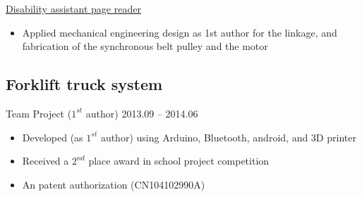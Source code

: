 \documentclass[11pt,a4paper,sans]{moderncv}
\begin{document}
\vspace{6pt}

\underline{Disability assistant page reader}
\vspace{2pt}
\begin{itemize}
\item Applied mechanical engineering design as 1st author for the linkage, and fabrication of the synchronous belt pulley and the motor
\end{itemize} 

\subsection{Forklift truck system}
Team Project ($1^{st}$ author) \hfill 2013.09 -- 2014.06
\begin{itemize}
\item Developed (as $1^{st}$ author) using Arduino, Bluetooth, android, and 3D printer
\item Received a $2^{nd}$ place award in school project competition
\item An patent authorization (CN104102990A)
\end{itemize}
\end{document}
